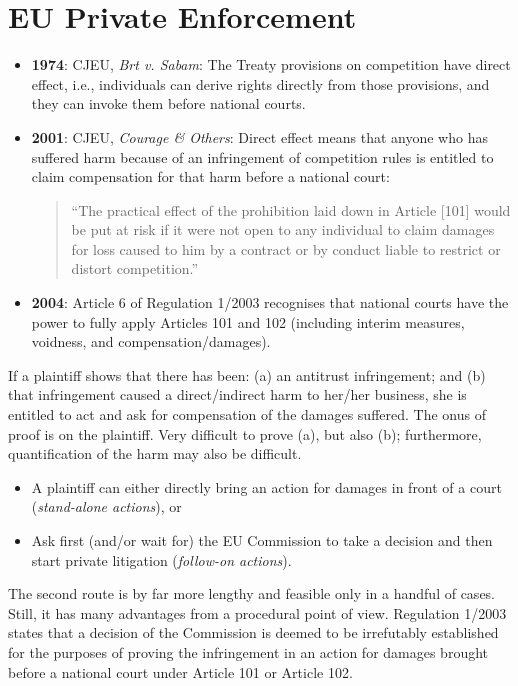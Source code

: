\newpage
\section{EU Private Enforcement}

    \begin{itemize}
        \item \textbf{1974}: CJEU, \textit{Brt v. Sabam}: The Treaty provisions on competition have direct effect, i.e., individuals can derive rights directly from those provisions, and they can invoke them before national courts.
        \item \textbf{2001}: CJEU, \textit{Courage \& Others}: Direct effect means that anyone who has suffered harm because of an infringement of competition rules is entitled to claim compensation for that harm before a national court: 
        \begin{quote}
        ``The practical effect of the prohibition laid down in Article [101] would be put at risk if it were not open to any individual to claim damages for loss caused to him by a contract or by conduct liable to restrict or distort competition.''
        \end{quote}
        \item \textbf{2004}: Article 6 of Regulation 1/2003 recognises that national courts have the power to fully apply Articles 101 and 102 (including interim measures, voidness, and compensation/damages).
    \end{itemize}

    \noindent If a plaintiff shows that there has been: (a) an antitrust infringement; and (b) that infringement caused a direct/indirect harm to her/her business, she is entitled to act and ask for compensation of the damages suffered. The onus of proof is on the plaintiff. Very difficult to prove (a), but also (b); furthermore, quantification of the harm may also be difficult.

    \begin{itemize}
        \item A plaintiff can either directly bring an action for damages in front of a court (\textit{stand-alone actions}), or
        \item Ask first (and/or wait for) the EU Commission to take a decision and then start private litigation (\textit{follow-on actions}).
    \end{itemize}
    
    \noindent The second route is by far more lengthy and feasible only in a handful of cases. Still, it has many advantages from a procedural point of view. Regulation 1/2003 states that a decision of the Commission is deemed to be irrefutably established for the purposes of proving the infringement in an action for damages brought before a national court under Article 101 or Article 102.

